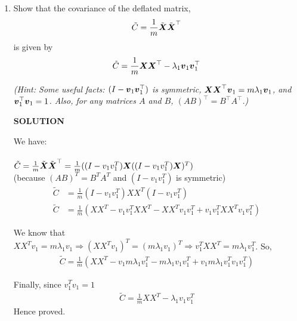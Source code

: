 \documentclass{article}
\begin{document}
\begin{enumerate}[label=(\alph*)]
\item Show that the covariance of the deflated matrix,
\[
\tilde C  = \frac{1}{m} \tilde {\boldsymbol{X}} \tilde {\boldsymbol{X}}^\top
\]
is given by 
\[
\tilde C = \frac{1}{m} \boldsymbol{X} \boldsymbol{X}^\top - \lambda_1 \boldsymbol{v}_1 \boldsymbol{v}_1^\top
\]

\emph{(Hint: Some useful facts: $(I - \boldsymbol{v}_1 \boldsymbol{v}_1^\top)$ is symmetric, $\boldsymbol{X} \boldsymbol{X}^\top \boldsymbol{v}_1 = m \lambda_1 \boldsymbol{v}_1$, and $\boldsymbol{v}_1^\top \boldsymbol{v}_1 = 1$. Also, for any matrices $A$ and $B$, $(AB)^\top = B^\top A^\top$.)}

\textbf{SOLUTION}
\begin{mdframed}[backgroundcolor=lightgray]
We have:\\\\
 $\tilde C = \frac{1}{m} \tilde {\boldsymbol{X}} \tilde {\boldsymbol{X}}^\top = \frac{1}{m}((I - v_1 v_1^T) \boldsymbol{X} ((I - v_1 v_1^T) \boldsymbol{X})^{T})$ \\

(because $(AB)^T = B^TA^T$ and $(I - v_1 v_1^T)$ is symmetric)
\begin{align*}
\tilde C  &= \frac{1}{m} (I - v_1 v_1^T)XX^T(I - v_1 v_1^T)\\
\tilde C  &= \frac{1}{m} (XX^T - v_1 v_1^TXX^T -XX^Tv_1 v_1^T + v_1 v_1^TXX^Tv_1 v_1^T)
\end{align*}

We know that $XX^Tv_1 = m\lambda_1v_1 \Rightarrow (XX^Tv_1)^T = (m\lambda_1v_1)^T \Rightarrow v_1^TXX^T = m\lambda_1v_1^T$. So, 
\begin{align*}
\tilde C  = \frac{1}{m} (XX^T -v_1m\lambda_1v_1^T -m\lambda_1v_1v_1^T + v_1m\lambda_1v_1^Tv_1v_1^T)
\end{align*}

Finally, since $v_1^Tv_1 = 1$
\begin{align*}
\tilde C = \frac{1}{m}XX^T - \lambda_1v_1v_1^T 
\end{align*}
Hence proved.
\end{mdframed}


\end{enumerate}
\end{document}

